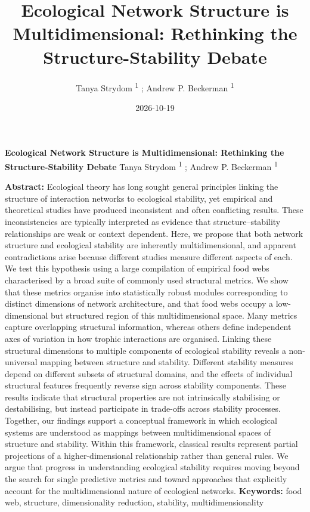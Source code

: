 \documentclass[
]{article}
\title{Ecological Network Structure is Multidimensional: Rethinking the
Structure-Stability Debate}
\author{Tanya Strydom %
%
\textsuperscript{%
%
1%
}%
; Andrew P. Beckerman %
%
\textsuperscript{%
%
1%
}%
}
\date{2026-10-19}
\begin{document}
\thispagestyle{empty}
{\bfseries\sffamily\Large Ecological Network Structure is
Multidimensional: Rethinking the Structure-Stability Debate}
\vfil
Tanya Strydom %
%
\textsuperscript{%
%
1%
}%
; Andrew P. Beckerman %
%
\textsuperscript{%
%
1%
}%

\vfil
{\small
\textbf{Abstract:} Ecological theory has long sought general principles
linking the structure of interaction networks to ecological stability,
yet empirical and theoretical studies have produced inconsistent and
often conflicting results. These inconsistencies are typically
interpreted as evidence that structure--stability relationships are weak
or context dependent. Here, we propose that both network structure and
ecological stability are inherently multidimensional, and apparent
contradictions arise because different studies measure different aspects
of each. We test this hypothesis using a large compilation of empirical
food webs characterised by a broad suite of commonly used structural
metrics. We show that these metrics organise into statistically robust
modules corresponding to distinct dimensions of network architecture,
and that food webs occupy a low-dimensional but structured region of
this multidimensional space. Many metrics capture overlapping structural
information, whereas others define independent axes of variation in how
trophic interactions are organised. Linking these structural dimensions
to multiple components of ecological stability reveals a non-universal
mapping between structure and stability. Different stability measures
depend on different subsets of structural domains, and the effects of
individual structural features frequently reverse sign across stability
components. These results indicate that structural properties are not
intrinsically stabilising or destabilising, but instead participate in
trade-offs across stability processes. Together, our findings support a
conceptual framework in which ecological systems are understood as
mappings between multidimensional spaces of structure and stability.
Within this framework, classical results represent partial projections
of a higher-dimensional relationship rather than general rules. We argue
that progress in understanding ecological stability requires moving
beyond the search for single predictive metrics and toward approaches
that explicitly account for the multidimensional nature of ecological
networks.
\vfil
\textbf{Keywords:} %
food web, structure, dimensionality reduction, stability, %
multidimensionality%
}
\clearpage
\setcounter{page}{1}
\doublespacing
\linenumbers
\end{document}
